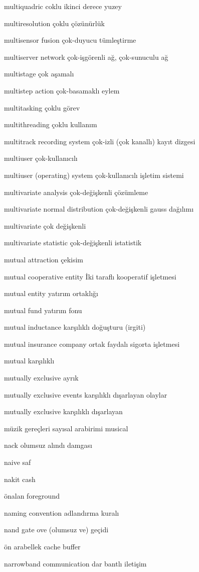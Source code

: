 \documentclass[12pt,fleqn]{article}\usepackage{../../common}
\begin{document}
multiquadric coklu ikinci derece yuzey

multiresolution çoklu çözünürlük

multisensor fusion çok-duyucu tümleştirme

multiserver network çok-işgörenli ağ, çok-sunuculu ağ

multistage çok aşamalı

multistep action çok-basamaklı eylem

multitasking çoklu görev

multithreading çoklu kullanım

multitrack recording system çok-izli (çok kanallı) kayıt dizgesi

multiuser çok-kullanıcılı

multiuser (operating) system çok-kullanıcılı işletim sistemi

multivariate analysis çok-değişkenli çözümleme

multivariate normal distribution çok-değişkenli gauss dağılımı

multivariate çok değişkenli

multivariate statistic çok-değişkenli istatistik

mutual attraction çekisim

mutual cooperative entity İki taraflı kooperatif işletmesi

mutual entity yatırım ortaklığı

mutual fund yatırım fonu

mutual inductance karşılıklı doğuşturu (irgiti)

mutual insurance company ortak faydalı sigorta işletmesi

mutual karşılıklı

mutually exclusive ayrık

mutually exclusive events karşılıklı dışarlayan olaylar

mutually exclusive karşılıklı dışarlayan

müzik gereçleri sayısal arabirimi musical

nack olumsuz alındı damgası

naive saf

nakit cash

önalan foreground

naming convention adlandırma kuralı

nand gate ove (olumsuz ve) geçidi

ön arabellek cache buffer

narrowband communication dar bantlı iletişim
\end{document}
